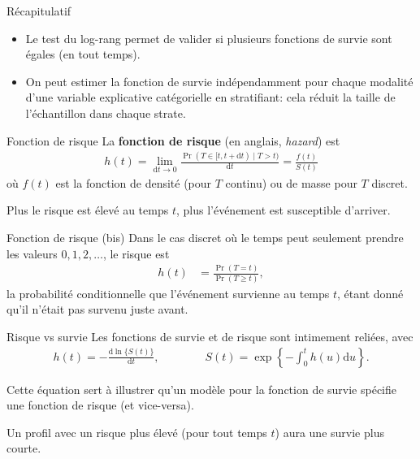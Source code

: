 \documentclass[
  ignorenonframetext,
]{beamer}
\providecommand{\tightlist}{%
  \setlength{\itemsep}{0pt}\setlength{\parskip}{0pt}}\usepackage{longtable,booktabs,array}
\begin{document}
\begin{frame}{Récapitulatif}
\protect\hypertarget{ruxe9capitulatif-4}{}
\begin{itemize}
\tightlist
\item
  Le test du log-rang permet de valider si plusieurs fonctions de survie
  sont égales (en tout temps).
\item
  On peut estimer la fonction de survie indépendamment pour chaque
  modalité d'une variable explicative catégorielle en stratifiant: cela
  réduit la taille de l'échantillon dans chaque strate.
\end{itemize}
\end{frame}

\begin{frame}{Fonction de risque}
\protect\hypertarget{fonction-de-risque}{}
La \textbf{fonction de risque} (en anglais, \emph{hazard}) est
\begin{align*}
h(t) =  \lim_{\mathrm{d} t \to 0} \frac{\Pr(T \in [t, t + \mathrm{d} t) \mid T > t)}{\mathrm{d} t} = \frac{f(t)}{S(t)}
\end{align*} où \(f(t)\) est la fonction de densité (pour \(T\) continu)
ou de masse pour \(T\) discret.

Plus le risque est élevé au temps \(t\), plus l'événement est
susceptible d'arriver.
\end{frame}

\begin{frame}{Fonction de risque (bis)}
\protect\hypertarget{fonction-de-risque-bis}{}
Dans le cas discret où le temps peut seulement prendre les valeurs
\(0, 1, 2, \ldots\), le risque est \begin{align*}
h(t) &= \frac{\Pr(T=t)}{\Pr(T \geq t)},
\end{align*} la probabilité conditionnelle que l'événement survienne au
temps \(t\), étant donné qu'il n'était pas survenu juste avant.
\end{frame}

\begin{frame}{Risque vs survie}
\protect\hypertarget{risque-vs-survie}{}
Les fonctions de survie et de risque sont intimement reliées, avec
\begin{align*}
h(t) = - \frac{\mathrm{d} \ln\{S(t)\}}{\mathrm{d} t}, \qquad \qquad S(t) = \exp \left\{ -\int_0^t h(u) \mathrm{d} u\right\}.
\end{align*}

Cette équation sert à illustrer qu'un modèle pour la fonction de survie
spécifie une fonction de risque (et vice-versa).

Un profil avec un risque plus élevé (pour tout temps \(t\)) aura une
survie plus courte.
\end{frame}
\end{document}

